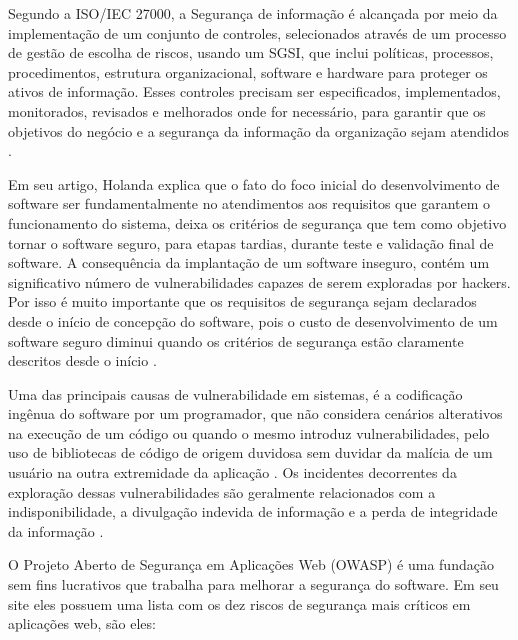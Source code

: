 Segundo a ISO/IEC 27000, a Segurança de informação é alcançada por meio da implementação de um conjunto de controles, selecionados através de um processo de gestão de escolha de riscos, usando um SGSI, que inclui políticas, processos, procedimentos, estrutura organizacional, software e hardware para proteger os ativos de informação. Esses controles precisam ser especificados, implementados, monitorados, revisados e melhorados onde for necessário, para garantir que  os objetivos do negócio e a segurança da informação da organização sejam atendidos \cite{ISO27000}.



Em seu artigo, Holanda \cite{holanda2009segurancca} explica que o fato do foco inicial do desenvolvimento de software ser fundamentalmente no atendimentos aos requisitos que garantem o funcionamento do sistema, deixa os critérios de segurança que tem como objetivo tornar o software seguro, para etapas tardias, durante teste e validação final de software. A consequência da implantação de um software inseguro, contém um significativo número de vulnerabilidades capazes de serem exploradas por hackers. Por isso é muito importante que os requisitos de segurança sejam declarados desde o início de concepção do software, pois o custo de desenvolvimento de um software seguro diminui quando os critérios de segurança estão claramente descritos desde o início \cite{holanda2009segurancca}.

Uma das principais causas de vulnerabilidade em sistemas, é a codificação ingênua do software por um programador, que não considera cenários alterativos na execução de um código ou quando o mesmo introduz vulnerabilidades, pelo uso de bibliotecas de código de origem duvidosa sem duvidar da malícia de um usuário na outra extremidade da aplicação \cite{holanda2009segurancca}. Os incidentes decorrentes da exploração dessas vulnerabilidades são geralmente relacionados com a indisponibilidade, a divulgação indevida de informação e a perda de integridade da informação \cite{holanda2009segurancca}.

O Projeto Aberto de Segurança em Aplicações Web (OWASP) é uma fundação sem fins lucrativos que trabalha para melhorar a segurança do software. Em seu site eles possuem uma lista \cite{owasp} com os dez riscos de segurança mais críticos em aplicações web, são eles:

